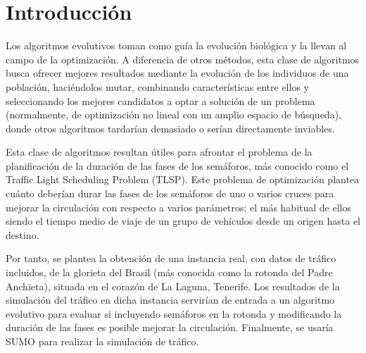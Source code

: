 \chapter{Introducción}
\label{cap:1intro}

Los algoritmos evolutivos toman como guía la evolución biológica y la llevan al campo de la optimización. A diferencia de otros métodos, esta clase de algoritmos busca ofrecer mejores resultados mediante la evolución de los individuos de una población, haciéndolos mutar, combinando características entre ellos y seleccionando los mejores candidatos a optar a solución de un problema (normalmente, de optimización no lineal con un amplio espacio de búsqueda), donde otros algoritmos tardarían demasiado o serían directamente inviables. \cite{eiben_introduction_2003}

Esta clase de algoritmos resultan útiles para afrontar el problema de la planificación de la duración de las fases de los semáforos, más conocido como el Traffic Light Scheduling Problem (TLSP). Este problema de optimización plantea cuánto deberían durar las fases de los semáforos de uno o varios cruces para mejorar la circulación con respecto a varios parámetros; el más habitual de ellos siendo el tiempo medio de viaje de un grupo de vehículos desde un origen hasta el destino.

Por tanto, se plantea la obtención de una instancia real, con datos de tráfico incluidos, de la glorieta del Brasil (más conocida como la rotonda del Padre Anchieta), situada en el corazón de La Laguna, Tenerife. Los resultados de la simulación del tráfico en dicha instancia servirían de entrada a un algoritmo evolutivo para evaluar si incluyendo semáforos en la rotonda y modificando la duración de las fases es posible mejorar la circulación. Finalmente, se usaría SUMO \cite{lopez_microscopic_2018} para realizar la simulación de tráfico.

